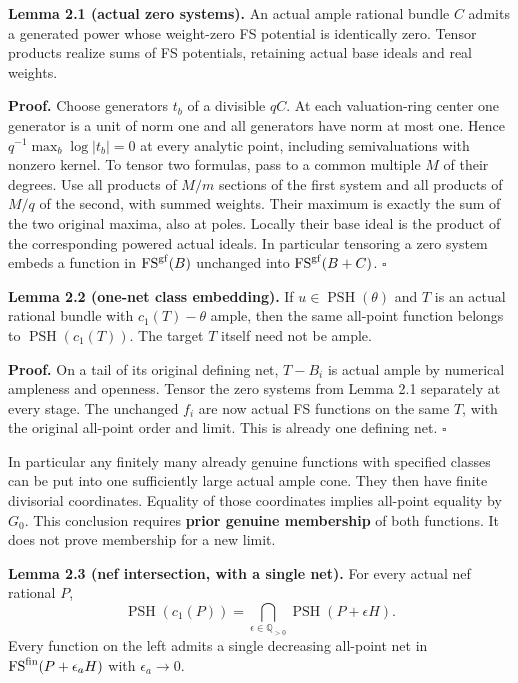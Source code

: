 \documentclass[
  10pt,
]{article}
\begin{document}
\textbf{Lemma 2.1 (actual zero systems).} An actual ample rational
bundle \(C\) admits a generated power whose weight-zero FS potential is
identically zero. Tensor products realize sums of FS potentials,
retaining actual base ideals and real weights.

\textbf{Proof.} Choose generators \(t_b\) of a divisible \(qC\). At each
valuation-ring center one generator is a unit of norm one and all
generators have norm at most one. Hence \(q^{-1}\max_b\log|t_b|=0\) at
every analytic point, including semivaluations with nonzero kernel. To
tensor two formulas, pass to a common multiple \(M\) of their degrees.
Use all products of \(M/m\) sections of the first system and all
products of \(M/q\) of the second, with summed weights. Their maximum is
exactly the sum of the two original maxima, also at poles. Locally their
base ideal is the product of the corresponding powered actual ideals. In
particular tensoring a zero system embeds a function in
\(\operatorname{FS}^{\rm gf}(B)\) unchanged into
\(\operatorname{FS}^{\rm gf}(B+C)\). \(\square\)

\textbf{Lemma 2.2 (one-net class embedding).} If
\(u\in\operatorname{PSH}(\theta)\) and \(T\) is an actual rational
bundle with \(c_1(T)-\theta\) ample, then the same all-point function
belongs to \(\operatorname{PSH}(c_1(T))\). The target \(T\) itself need
not be ample.

\textbf{Proof.} On a tail of its original defining net, \(T-B_i\) is
actual ample by numerical ampleness and openness. Tensor the zero
systems from Lemma 2.1 separately at every stage. The unchanged \(f_i\)
are now actual FS functions on the same \(T\), with the original
all-point order and limit. This is already one defining net. \(\square\)

In particular any finitely many already genuine functions with specified
classes can be put into one sufficiently large actual ample cone. They
then have finite divisorial coordinates. Equality of those coordinates
implies all-point equality by \(G_0\). This conclusion requires
\textbf{prior genuine membership} of both functions. It does not prove
membership for a new limit.

\textbf{Lemma 2.3 (nef intersection, with a single net).} For every
actual nef rational \(P\), \[
 \operatorname{PSH}(c_1(P))
   =\bigcap_{\epsilon\in\mathbb Q_{>0}}
                      \operatorname{PSH}(P+\epsilon H).            \tag{2.1}
\] Every function on the left admits a single decreasing all-point net
in \(\operatorname{FS}^{\rm fin}(P+\epsilon_aH)\) with
\(\epsilon_a\to0\).
\end{document}
